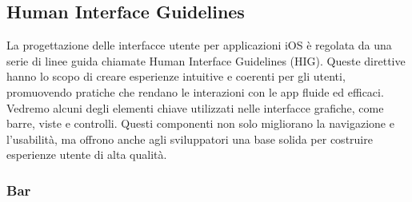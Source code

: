 \subsection{Human Interface Guidelines}
La progettazione delle interfacce utente per applicazioni iOS è regolata da una serie di linee guida chiamate Human Interface Guidelines (HIG). Queste direttive hanno lo scopo di creare esperienze intuitive e coerenti per gli utenti, promuovendo pratiche che rendano le interazioni con le app fluide ed efficaci.
Vedremo alcuni degli elementi chiave utilizzati nelle interfacce grafiche, come barre, viste e controlli. Questi componenti non solo migliorano la navigazione e l'usabilità, ma offrono anche agli sviluppatori una base solida per costruire esperienze utente di alta qualità.

\subsubsection{Bar}
